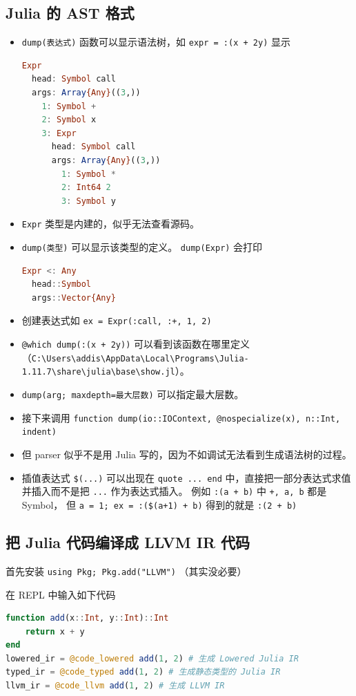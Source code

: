 \subsection{Julia 的 AST 格式}
\begin{itemize}
\item \verb`dump(表达式)` 函数可以显示语法树，如 \verb`expr = :(x + 2y)` 显示
\begin{lstlisting}[language=julia]
Expr
  head: Symbol call
  args: Array{Any}((3,))
    1: Symbol +
    2: Symbol x
    3: Expr
      head: Symbol call
      args: Array{Any}((3,))
        1: Symbol *
        2: Int64 2
        3: Symbol y
\end{lstlisting}
\item \verb`Expr` 类型是内建的，似乎无法查看源码。
\item \verb`dump(类型)` 可以显示该类型的定义。 \verb`dump(Expr)` 会打印 
\begin{lstlisting}[language=julia]
Expr <: Any
  head::Symbol
  args::Vector{Any}
\end{lstlisting}
\item 创建表达式如 \verb`ex = Expr(:call, :+, 1, 2)`
\item \verb`@which dump(:(x + 2y))` 可以看到该函数在哪里定义（\verb`C:\Users\addis\AppData\Local\Programs\Julia-1.11.7\share\julia\base\show.jl`）。
\item \verb`dump(arg; maxdepth=最大层数)` 可以指定最大层数。
\item 接下来调用 \verb`function dump(io::IOContext, @nospecialize(x), n::Int, indent)`
\item 但 parser 似乎不是用 Julia 写的，因为不如调试无法看到生成语法树的过程。
\item 插值表达式 \verb`$(...)` 可以出现在 \verb`quote ... end` 中，直接把一部分表达式求值并插入而不是把 \verb`...` 作为表达式插入。 例如 \verb`:(a + b)` 中 \verb`+, a, b` 都是 Symbol， 但 \verb`a = 1; ex = :($(a+1) + b)` 得到的就是 \verb`:(2 + b)`
\end{itemize}


\subsection{把 Julia 代码编译成 LLVM IR 代码}
首先安装 \verb`using Pkg; Pkg.add("LLVM")` （其实没必要）

在 REPL 中输入如下代码
\begin{lstlisting}[language=julia,caption=julia]
function add(x::Int, y::Int)::Int
    return x + y
end
lowered_ir = @code_lowered add(1, 2) # 生成 Lowered Julia IR
typed_ir = @code_typed add(1, 2) # 生成静态类型的 Julia IR
llvm_ir = @code_llvm add(1, 2) # 生成 LLVM IR
\end{lstlisting}


